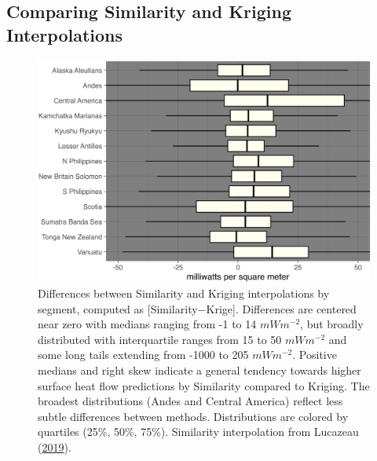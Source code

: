 \endgroup

\clearpage

\hypertarget{interpDiffAppendix}{%
\subsection{Comparing Similarity and Kriging Interpolations}\label{interpDiffAppendix}}



\begin{figure}[htbp]

{\centering \includegraphics[width=1\linewidth,]{assets/figs/chpt3/interpDiffSummary} 

}

\caption[Differences between Similarity and Kriging interpolations]{Differences between Similarity and Kriging interpolations by segment, computed as {[}Similarity\(-\)Krige{]}. Differences are centered near zero with medians ranging from -1 to 14 \(mWm^{-2}\), but broadly distributed with interquartile ranges from 15 to 50 \(mWm^{-2}\) and some long tails extending from -1000 to 205 \(mWm^{-2}\). Positive medians and right skew indicate a general tendency towards higher surface heat flow predictions by Similarity compared to Kriging. The broadest distributions (Andes and Central America) reflect less subtle differences between methods. Distributions are colored by quartiles (25\%, 50\%, 75\%). Similarity interpolation from Lucazeau (\protect\hyperlink{ref-lucazeau2019}{2019}).}\label{fig:diffSummaryPlot}
\end{figure}



